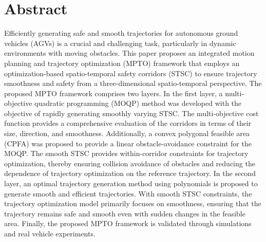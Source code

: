 \section{Abstract} 
Efficiently generating safe and smooth trajectories for autonomous ground vehicles (AGVs) is a crucial and challenging task, particularly in dynamic environments with moving obstacles. This paper proposes an integrated motion planning and trajectory optimization (MPTO) framework that employs an optimization-based spatio-temporal safety corridors (STSC) to ensure trajectory smoothness and safety from a three-dimensional spatio-temporal perspective. The proposed MPTO framework comprises two layers. In the first layer, a multi-objective quadratic programming (MOQP) method was developed with the objective of rapidly generating smoothly varying STSC. The multi-objective cost function provides a comprehensive evaluation of the corridors in terms of their size, direction, and smoothness. Additionally, a convex polygonal feasible area (CPFA) was proposed to provide a linear obstacle-avoidance constraint for the MOQP. The smooth STSC provides within-corridor constraints for trajectory optimization, thereby ensuring collision avoidance of obstacles and reducing the dependence of trajectory optimization on the reference trajectory. In the second layer, an optimal trajectory generation method using polynomials is proposed to generate smooth and efficient trajectories. With smooth STSC constraints, the trajectory optimization model primarily focuses on smoothness, ensuring that the trajectory remains safe and smooth even with sudden changes in the feasible area. Finally, the proposed MPTO framework is validated through simulations and real vehicle experiments.




%
%		
    

